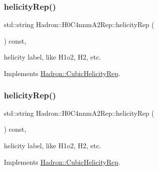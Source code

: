 \mbox{\label{structHadron_1_1H0C4nnmA2Rep_ace5618f2fa58722ccfaa15a545339f88}} 
\subsubsection{\texorpdfstring{helicityRep()}{helicityRep()}\hspace{0.1cm}{\footnotesize\ttfamily [1/2]}}
{\footnotesize\ttfamily std\+::string Hadron\+::\+H0\+C4nnm\+A2\+Rep\+::helicity\+Rep (\begin{DoxyParamCaption}{ }\end{DoxyParamCaption}) const\hspace{0.3cm}{\ttfamily [inline]}, {\ttfamily [virtual]}}

helicity label, like H1o2, H2, etc. 

Implements \mbox{\hyperlink{structHadron_1_1CubicHelicityRep_af1096946b7470edf0a55451cc662f231}{Hadron\+::\+Cubic\+Helicity\+Rep}}.

\mbox{\label{structHadron_1_1H0C4nnmA2Rep_ace5618f2fa58722ccfaa15a545339f88}} 
\subsubsection{\texorpdfstring{helicityRep()}{helicityRep()}\hspace{0.1cm}{\footnotesize\ttfamily [2/2]}}
{\footnotesize\ttfamily std\+::string Hadron\+::\+H0\+C4nnm\+A2\+Rep\+::helicity\+Rep (\begin{DoxyParamCaption}{ }\end{DoxyParamCaption}) const\hspace{0.3cm}{\ttfamily [inline]}, {\ttfamily [virtual]}}

helicity label, like H1o2, H2, etc. 

Implements \mbox{\hyperlink{structHadron_1_1CubicHelicityRep_af1096946b7470edf0a55451cc662f231}{Hadron\+::\+Cubic\+Helicity\+Rep}}.

\mbox{\label{structHadron_1_1H0C4nnmA2Rep_a7d5e9bf3b8a6abda949a015707a87dff}} 
